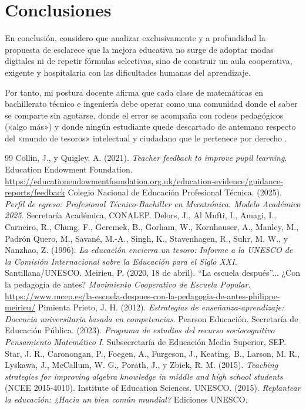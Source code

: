 \documentclass[spanish,letterpaper,oneside]{article}
\begin{document}
\clearpage
\section{Conclusiones}
En conclusión, considero que analizar exclusivamente y a profundidad la propuesta de \citet{meirieu2020escuela} esclarece que la mejora educativa no surge de adoptar modas digitales ni de repetir fórmulas selectivas, sino de construir un aula cooperativa, exigente y hospitalaria con las dificultades humanas del aprendizaje.

Por tanto, mi postura docente afirma que cada clase de matemáticas en bachillerato técnico e ingeniería debe operar como una comunidad donde el saber se comparte sin agotarse, donde el error se acompaña con rodeos pedagógicos («algo más») y donde ningún estudiante quede descartado de antemano respecto del «mundo de tesoros» intelectual y ciudadano que le pertenece por derecho \citep{meirieu2020escuela,delors1996educacion}.

\clearpage
\begin{thebibliography}{99}
 Collin, J., y Quigley, A. (2021). \textit{Teacher feedback to improve pupil learning}. Education Endowment Foundation. \url{https://educationendowmentfoundation.org.uk/education-evidence/guidance-reports/feedback}
 Colegio Nacional de Educación Profesional Técnica. (2025). \textit{Perfil de egreso: Profesional Técnico-Bachiller en Mecatrónica. Modelo Académico 2025}. Secretaría Académica, CONALEP.
 Delors, J., Al Mufti, I., Amagi, I., Carneiro, R., Chung, F., Geremek, B., Gorham, W., Kornhauser, A., Manley, M., Padrón Quero, M., Savané, M.-A., Singh, K., Stavenhagen, R., Suhr, M. W., y Nanzhao, Z. (1996). \textit{La educación encierra un tesoro: Informe a la UNESCO de la Comisión Internacional sobre la Educación para el Siglo XXI}. Santillana/UNESCO.
 Meirieu, P. (2020, 18 de abril). ``La escuela después''... ¿Con la pedagogía de antes? \textit{Movimiento Cooperativo de Escuela Popular}. \url{https://www.mcep.es/la-escuela-despues-con-la-pedagogia-de-antes-philippe-meirieu/}
 Pimienta Prieto, J. H. (2012). \textit{Estrategias de enseñanza-aprendizaje: Docencia universitaria basada en competencias}. Pearson Educación.
 Secretaría de Educación Pública. (2023). \textit{Programa de estudios del recurso sociocognitivo Pensamiento Matemático I}. Subsecretaría de Educación Media Superior, SEP.
 Star, J. R., Caronongan, P., Foegen, A., Furgeson, J., Keating, B., Larson, M. R., Lyskawa, J., McCallum, W. G., Porath, J., y Zbiek, R. M. (2015). \textit{Teaching strategies for improving algebra knowledge in middle and high school students} (NCEE 2015-4010). Institute of Education Sciences.
 UNESCO. (2015). \textit{Replantear la educación: ¿Hacia un bien común mundial?} Ediciones UNESCO.
\end{thebibliography}
\end{document}
